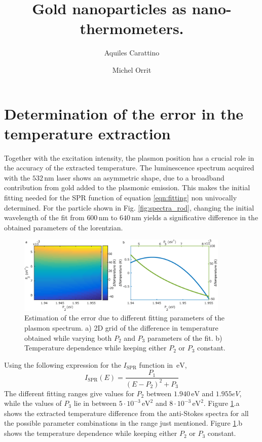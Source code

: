 \documentclass[journal=nalefd,manuscript=letter]{achemso}
\author{Aquiles Carattino}
\affiliation[Leiden]
{Huygens-Kamerlingh Onnes Lab, 2300RA Leiden, The Netherlands}
\author{Michel Orrit}
\affiliation[Leiden]
{Huygens-Kamerlingh Onnes Lab, 2300RA Leiden, The Netherlands}
\title{Gold nanoparticles as nano-thermometers.}
\newcommand{\nm}{\ensuremath{\,\textrm{nm}}}
\newcommand{\eV}{\ensuremath{\,\textrm{eV}}}
\begin{document}
\maketitle

\section{Determination of the error in the temperature
extraction}\label{sec:discussion_errors} Together with the excitation intensity,
the plasmon position has a crucial role in the accuracy of the extracted temperature. The luminescence spectrum acquired
with the $532\nm$ laser shows an asymmetric shape, due to a broadband
contribution from gold added to the plasmonic emission. This makes the initial
fitting needed for the SPR function of equation \ref{eqn:fitting} non univocally
determined. For the particle shown in Fig. \ref{fig:spectra_rod}, changing the
initial wavelength of the fit from $600\nm$ to $640\nm$ yields a significative
difference in the obtained parameters of the lorentzian.

\begin{figure}[htp] \centering
\includegraphics[width=0.90\textwidth]{Figures/05_Estimation_error/05_estimation_error.png}
\caption{Estimation of the error due to different fitting parameters of the
plasmon spectrum. a) 2D grid of the difference in temperature obtained while
varying both $P_2$ and $P_3$ parameters of the fit. b) Temperature dependence
while keeping either $P_2$ or $P_3$ constant.}
	\label{fig:estimation-error}
\end{figure}

Using the following expression for the $I_\textrm{SPR}$ function in $\eV$, 
\begin{equation*}
I_\textrm{SPR}(E) = \frac{P_1}{(E-P_2)^2+P_3}
\end{equation*}
The different fitting ranges give values for $P_2$ between $1.940\eV$ and
$1.955eV$, while the values of $P_3$ lie in between $5\cdot10^{-3}\eV^2$ and
$8\cdot10^{-3}\eV^2$. Figure \ref{fig:estimation-error}.a shows the extracted
temperature difference from the anti-Stokes spectra for all the possible
parameter combinations in the range just mentioned. Figure \ref{fig:estimation-error}.b
shows the temperature dependence while keeping either $P_2$ or $P_3$ constant.
\end{document}
